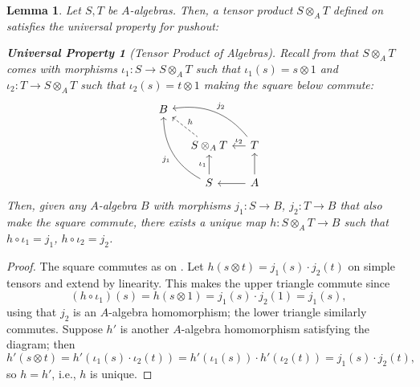 \documentclass[10pt]{article}
\newtheorem*{universalproperty}{Universal Property}
\newtheorem{lemma}[subsubsection]{Lemma}
\theoremstyle{definition}
\theoremstyle{remark}
\numberwithin{equation}{section}
\numberwithin{figure}{subsubsection}
\begin{document}
\begin{lemma}\label{tpalg}
  Let $S,T$ be $A$-algebras. Then, a tensor product $S \otimes_A T$ defined on \emph{\cite[p.~30--31]{AM69}} satisfies the universal property for pushout:
  \begin{universalproperty}[Tensor Product of Algebras]
    Recall from \emph{\cite[p.~30--31]{AM69}} that $S \otimes_A T$ comes with morphisms $\iota_1\colon S \to S \otimes_A T$ such that $\iota_1(s) = s \otimes 1$ and $\iota_2\colon T \to S \otimes_A T$ such that $\iota_2(s) = t \otimes 1$ making the square below commute:
    \begin{equation*}
      \begin{tikzcd}[column sep=small]
        B\arrow[bend left,leftarrow]{drr}{j_2}\arrow[bend right,leftarrow]{ddr}[swap]{j_1}\arrow[dashed,leftarrow]{dr}{h}\\
        &S \otimes_A T\dar[swap,leftarrow]{\iota_1} \rar[leftarrow]{\iota_2} & T\dar[leftarrow]\\
        &S \rar[leftarrow] & A
      \end{tikzcd}
    \end{equation*}
    Then, given any $A$-algebra $B$ with morphisms $j_1\colon S \to B$, $j_2\colon T \to B$ that also make the square commute, there exists a unique map $h\colon S \otimes_A T \to B$ such that $h \circ \iota_1 = j_1$, $h \circ \iota_2 = j_2$.
  \end{universalproperty}
\end{lemma}
\begin{proof}
  The square commutes as on \cite[p.~31]{AM69}. Let $h(s \otimes t) = j_1(s) \cdot j_2(t)$ on simple tensors and extend by linearity. This makes the upper triangle commute since
  \begin{equation*}
    (h \circ \iota_1)(s) = h(s \otimes 1) = j_1(s) \cdot j_2(1) = j_1(s),
  \end{equation*}
  using that $j_2$ is an $A$-algebra homomorphism; the lower triangle similarly commutes. Suppose $h'$ is another $A$-algebra homomorphism satisfying the diagram; then
  \begin{equation*}
    h'(s \otimes t) = h'(\iota_1(s) \cdot \iota_2(t)) = h'(\iota_1(s)) \cdot h'(\iota_2(t)) = j_1(s) \cdot j_2(t),
  \end{equation*}
  so $h = h'$, i.e., $h$ is unique.
\end{proof}
\end{document}
